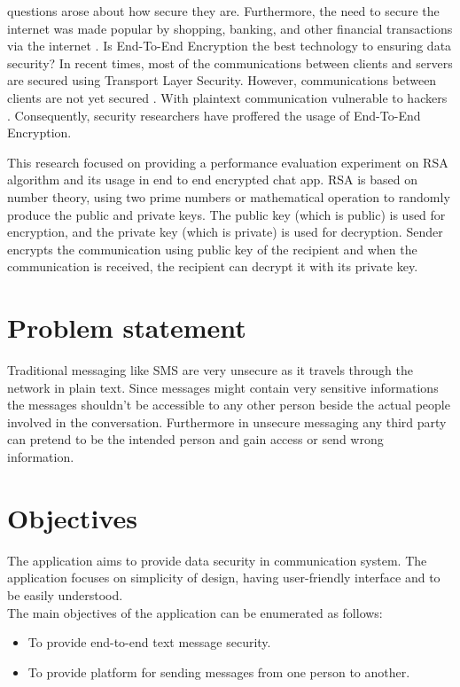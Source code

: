 questions arose about how secure they are. Furthermore, the
need to secure the internet was made popular by shopping,
banking, and other financial transactions via the internet .
Is End-To-End Encryption the best technology to ensuring
data security? In recent times, most of the communications
between clients and servers are secured using Transport
Layer Security. However, communications between clients
are not yet secured . With plaintext communication
vulnerable to hackers . Consequently, security
researchers have proffered the usage of End-To-End
Encryption.\par
This research focused on providing a performance
evaluation experiment on RSA algorithm and its usage in end to end encrypted
chat app. RSA is based
on number theory, using two prime numbers or
mathematical operation to randomly produce the public and
private keys. The public key (which is public) is used for
encryption, and the private key (which is private) is used for
decryption. Sender encrypts the communication using public
key of the recipient and when the communication is
received, the recipient can decrypt it with its private key.\cite{paley}


\pagebreak
\section{Problem statement}
\vspace{-18pt}
Traditional messaging like SMS are very unsecure as it travels through the network in plain text. Since messages might contain very sensitive informations the messages shouldn't be accessible to any other person beside the actual people involved in the conversation. Furthermore in unsecure messaging any third party can pretend to be the intended person and gain access or send wrong information.


\section{Objectives}
The application aims to provide data security in communication system. The application focuses on
simplicity of design, having user-friendly interface and to be easily understood. \\
The main objectives of the application can be enumerated as follows:
\vspace{-18pt}
\begin{itemize}
	\item To provide end-to-end text message security.
	\item To provide platform for sending messages from one person to another.
\end{itemize}

